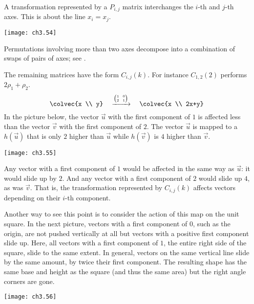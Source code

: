 A transformation represented by a $P_{i,j}$ matrix
interchanges the $i$-th and $j$-th axes.
This is  
about the line $x_i=x_j$.
\begin{center}
  \texttt{[image: ch3.54]}
\end{center}
Permutations involving more than two axes decompose into a combination 
of swaps of pairs of axes; see .

The remaining  matrices have the form $C_{i,j}(k)$.
For instance $C_{1,2}(2)$ performs $2\rho_1+\rho_2$. 
\begin{equation*}
  \colvec{x  \\  y}\quad
  \xrightarrow{\text{\tiny$\displaystyle\left(\begin{array}[r]{@{}c@{\hspace{0.8em}}c@{}}
                1  &0  \\
                2  &1  
          \end{array}\right)$}}  %
   \quad\colvec{x \\ 2x+y}
\end{equation*}
In the picture below, 
the vector $\vec{u}$ with the first component of $1$ is affected less 
than the vector $\vec{v}$ with the first component of $2$.
The vector $\vec{u}$ is mapped to a
$h(\vec{u})$ that is only $2$ higher than $\vec{u}$ while 
$h(\vec{v})$ is $4$ higher than $\vec{v}$.
\begin{center}
  \texttt{[image: ch3.55]}
\end{center}
Any vector with a first component of $1$ would be affected 
in the same way as $\vec{u}$:
it would slide up by $2$.
And any vector with a first component of $2$ would slide up $4$, 
as was $\vec{v}$.
That is, the transformation represented by 
$C_{i,j}(k)$ affects vectors depending on their $i$-th component.

Another way to see this point is to consider the action of this map 
on the unit square.
In the next picture,
vectors with a first component of $0$, such as the origin, are not pushed 
vertically at all but vectors with a positive first component slide up.
Here, all vectors with a first component of $1$, the entire 
right side of the square, slide to the same extent.
In general, vectors on the same vertical line slide by the same amount,
by twice their first component.
The resulting shape has the same base and height as the square
(and thus the same area) but the right angle corners are gone.
\begin{center}
  \texttt{[image: ch3.56]}
\end{center}

